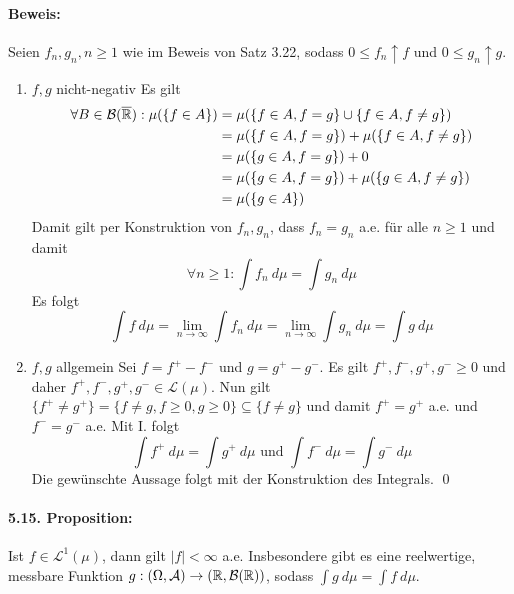 \documentclass[12pt]{report}
\begin{document}
  \paragraph{Beweis:}
  Seien $f_n,g_n,n\geq1$ wie im Beweis von Satz 3.22, sodass $0\leq f_n\uparrow f$ und $0\leq g_n\uparrow g$.
  \begin{enumerate}[label=\Roman*.]
      \item $f,g$ nicht-negativ\newline
      Es gilt 
      \begin{align*}
          \forall B\in\mathcal{B}(\overline{\mathbb{R}}):\mu(\{f\in A\})&=\mu(\{f\in A,f=g\}\cup\{f\in A,f\neq g\})\\
          &=\mu(\{f\in A,f=g\})+\mu(\{f\in A,f\neq g\})\\
          &=\mu(\{g\in A,f=g\})+0\\
          &=\mu(\{g\in A,f=g\})+\mu(\{g\in A,f\neq g\})\\
          &=\mu(\{g\in A\})
      \end{align*}
      Damit gilt per Konstruktion von $f_n,g_n$, dass $f_n=g_n$ a.e. f\"ur alle $n\geq1$ und damit 
      $$\forall n\geq1:\displaystyle\int f_n\ d\mu=\int g_n\ d\mu$$
      Es folgt 
      $$\int f\ d\mu=\lim_{n\to\infty}\int f_n\ d\mu=\lim_{n\to\infty}\int g_n\ d\mu=\int g\ d\mu$$
      \item $f,g$ allgemein\newline
      Sei $f=f^+-f^-$ und $g=g^+-g^-$. Es gilt $f^+,f^-,g^+,g^-\geq0$ und daher $f^+,f^-,g^+,g^-\in\mathcal{L}(\mu)$. Nun gilt $\{f^+\neq g^+\}=\{f\neq g,f\geq0,g\geq0\}\subseteq\{f\neq g\}$ und damit $f^+=g^+$ a.e. und $f^-=g^-$ a.e. Mit I. folgt
      $$\int f^+\ d\mu=\int g^+\ d\mu\text{ und }\int f^-\ d\mu=\int g^-\ d\mu$$
      Die gew\"unschte Aussage folgt mit der Konstruktion des Integrals. \qed
  \end{enumerate}
  
  \paragraph{5.15. Proposition:}Ist $f\in\mathcal{L}^1(\mu)$, dann gilt $|f|<\infty$ a.e. Insbesondere gibt es eine reelwertige, messbare Funktion $g:(\Omega,\mathcal{A})\to(\mathbb{R},\mathcal{B}(\mathbb{R}))$, sodass $\displaystyle\int g\ d\mu=\int f\ d\mu$.
  
\end{document}
